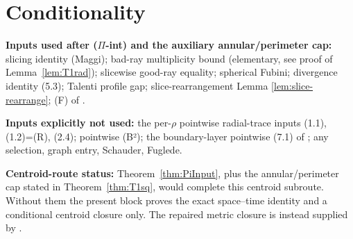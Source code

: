 \documentclass[11pt]{article}
\theoremstyle{definition}
\begin{document}
\section{Conditionality}\label{sec:conditionality}

\textbf{Inputs used after \textup{($\Pi$-int)} and the auxiliary annular/perimeter cap:}
slicing identity (Maggi); bad-ray multiplicity bound (elementary, see proof of Lemma~\ref{lem:T1rad}); slicewise good-ray equality; spherical Fubini;
divergence identity (5.3); Talenti profile gap;
slice-rearrangement Lemma \ref{lem:slice-rearrange}; (F) of
\cite{CentroidBound}.

\textbf{Inputs explicitly not used:} the per-$\rho$ pointwise radial-trace inputs (1.1), (1.2)=(R),
(2.4); pointwise (B²); the boundary-layer pointwise (7.1) of
\cite{BoundaryLayerTransfer}; any selection, graph entry,
Schauder, Fuglede.

\textbf{Centroid-route status:} Theorem~\ref{thm:PiInput}, plus the
annular/perimeter cap stated in Theorem~\ref{thm:T1sq}, would complete this
centroid subroute. Without them the present block proves the exact
space--time identity and a conditional centroid closure only. The repaired
metric closure is instead supplied by \cite{WeightedMetricTrace}.
\end{document}
